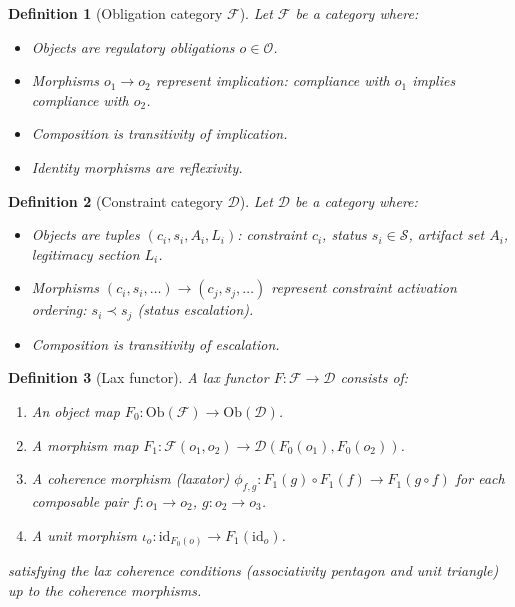 \documentclass[11pt,letterpaper]{article}
\theoremstyle{pirtmthm}
\newtheorem{definition}{Definition}[section]
\theoremstyle{remark}
\begin{document}
\begin{definition}[Obligation category $\mathcal{F}$]
Let $\mathcal{F}$ be a category where:
\begin{itemize}
  \item Objects are regulatory obligations $o \in \mathcal{O}$.
  \item Morphisms $o_1 \to o_2$ represent implication: compliance
    with $o_1$ implies compliance with $o_2$.
  \item Composition is transitivity of implication.
  \item Identity morphisms are reflexivity.
\end{itemize}
\end{definition}

\begin{definition}[Constraint category $\mathcal{D}$]
Let $\mathcal{D}$ be a category where:
\begin{itemize}
  \item Objects are tuples $(c_i, s_i, A_i, L_i)$: constraint $c_i$,
    status $s_i \in \mathcal{S}$, artifact set $A_i$, legitimacy
    section $L_i$.
  \item Morphisms $(c_i, s_i, \ldots) \to (c_j, s_j, \ldots)$ represent
    constraint activation ordering: $s_i \prec s_j$ (status escalation).
  \item Composition is transitivity of escalation.
\end{itemize}
\end{definition}

\begin{definition}[Lax functor]
\label{def:A-lax}
A \emph{lax functor} $F : \mathcal{F} \to \mathcal{D}$ consists of:
\begin{enumerate}[label=(\alph*)]
  \item An object map $F_0 : \mathrm{Ob}(\mathcal{F}) \to \mathrm{Ob}(\mathcal{D})$.
  \item A morphism map $F_1 : \mathcal{F}(o_1, o_2) \to \mathcal{D}(F_0(o_1), F_0(o_2))$.
  \item A coherence morphism (laxator) $\phi_{f,g} : F_1(g) \circ F_1(f) \to F_1(g \circ f)$
    for each composable pair $f : o_1 \to o_2$, $g : o_2 \to o_3$.
  \item A unit morphism $\iota_o : \mathrm{id}_{F_0(o)} \to F_1(\mathrm{id}_o)$.
\end{enumerate}
satisfying the lax coherence conditions (associativity pentagon and
unit triangle) up to the coherence morphisms.
\end{definition}
\end{document}
